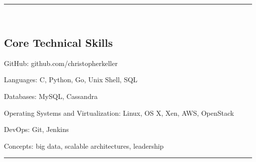 

\hrule\
\vspace{-0.4em}
\subsection*{Core Technical Skills}
\begin{indentsection}{\parindent}
    \begin{description*}
        \item[GitHub:] github.com/christopherkeller
        \item[Languages:] C, Python, Go, Unix Shell, \textsc{SQL}
        \item[Databases:] My\textsc{SQL}, Cassandra
        \item[Operating Systems and Virtualization:] Linux, \textsc{OS X}, Xen, AWS, OpenStack
        \item[DevOps:] Git, Jenkins
        \item[Concepts:] big data, scalable architectures, leadership
	\end{description*}
\end{indentsection}
\hrule\
\vspace{-0.4em}
